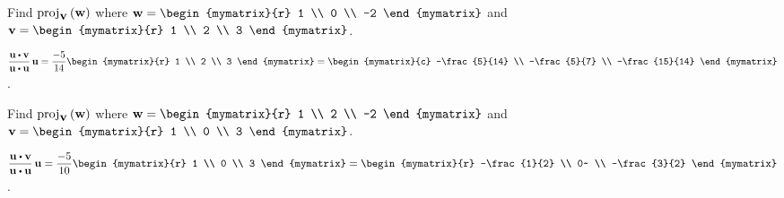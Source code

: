\begin{enumialphparenastyle}

\begin{ex}
  Find $\mbox{\rm proj}_{\mbox{\bf v}}\left(\mbox{\bf w}\right) $ where
  $\vect{w}=\begin{mymatrix}{r}
    1 \\
    0 \\
    -2
  \end{mymatrix}$ and $\vect{v}=\begin{mymatrix}{r}
    1 \\
    2 \\
    3
  \end{mymatrix}$.
  \begin{sol}
    $\displaystyle
    \def\arraystretch{1.2}
    \frac{\vect{u}\dotprod \vect{v}}{\vect{u}\dotprod
      \vect{u}}\,\vect{u}=\frac{-5}{14}\begin{mymatrix}{r}
      1 \\
      2 \\
      3
    \end{mymatrix} =\begin{mymatrix}{c}
      -\frac{5}{14} \\
      -\frac{5}{7} \\
      -\frac{15}{14}
    \end{mymatrix}$.
  \end{sol}
\end{ex}

\begin{ex} Find $\mbox{\rm proj}_{\mbox{\bf v}}\left(\mbox{\bf w}\right) $ where 
  $\vect{w}=\begin{mymatrix}{r}
    1 \\
    2 \\
    -2
  \end{mymatrix} $ and $\vect{v}=\begin{mymatrix}{r}
    1 \\
    0 \\
    3
  \end{mymatrix}$.
  \begin{sol}
    $\displaystyle
    \def\arraystretch{1.2}
    \frac{\vect{u}\dotprod \vect{v}}{\vect{u}\dotprod
      \vect{u}}\,\vect{u}=\frac{-5}{10}\begin{mymatrix}{r}
      1 \\
      0 \\
      3
    \end{mymatrix} =\begin{mymatrix}{r}
      -\frac{1}{2} \\
      0~ \\
      -\frac{3}{2}
    \end{mymatrix}$.
  \end{sol}
\end{ex}


\end{enumialphparenastyle}
